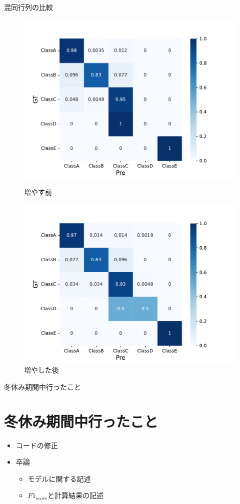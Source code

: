 \documentclass[leno,xcolor=dvipsnames]{beamer}
\begin{document}
  \begin{frame}{混同行列の比較}
    \begin{figure}[htbp]
      \begin{minipage}[b]{0.45\linewidth}
        \centering
        \includegraphics[keepaspectratio, scale=0.35]{images/deepimfam_confusion_matrix_ratio.pdf}
        \caption{増やす前}
      \end{minipage}
      \begin{minipage}[b]{0.45\linewidth}
        \centering
        \includegraphics[keepaspectratio, scale=0.35]{images/deepimfam_augmentation_confusion_matrix_ratio.pdf}
        \caption{増やした後}
      \end{minipage}
    \end{figure}
  \end{frame}
  \begin{frame}{冬休み期間中行ったこと}
    \section{冬休み期間中行ったこと}
    \begin{itemize}
      \item コードの修正
      \item 卒論
      \begin{itemize}
        \item モデルに関する記述
        \item $F1_{score}$と計算結果の記述
      \end{itemize}
    \end{itemize}
  \end{frame}
\end{document}
